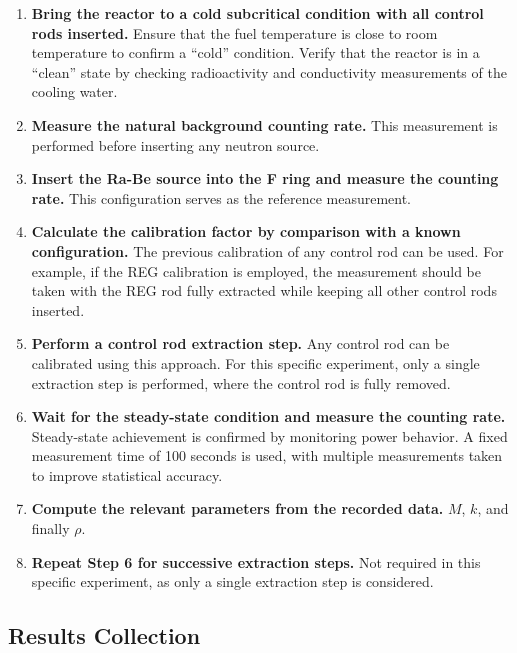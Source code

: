 \begin{enumerate}
    \item \textbf{Bring the reactor to a cold subcritical condition with all control rods inserted.}  
    Ensure that the fuel temperature is close to room temperature to confirm a ``cold'' condition.  
    Verify that the reactor is in a ``clean'' state by checking radioactivity and conductivity measurements of the cooling water.

    \item \textbf{Measure the natural background counting rate.}  
    This measurement is performed before inserting any neutron source.

    \item \textbf{Insert the Ra-Be source into the F ring and measure the counting rate.}  
    This configuration serves as the reference measurement.

    \item \textbf{Calculate the calibration factor by comparison with a known configuration.}  
    The previous calibration of any control rod can be used. For example, if the REG calibration is employed, the measurement should be taken with the REG rod fully extracted while keeping all other control rods inserted.

    \item \textbf{Perform a control rod extraction step.}  
    Any control rod can be calibrated using this approach. For this specific experiment, only a single extraction step is performed, where the control rod is fully removed.

    \item \textbf{Wait for the steady-state condition and measure the counting rate.}  
    Steady-state achievement is confirmed by monitoring power behavior.  
    A fixed measurement time of 100 seconds is used, with multiple measurements taken to improve statistical accuracy.

    \item \textbf{Compute the relevant parameters from the recorded data.} $M$, $k$, and finally $\rho$.

    \item \textbf{Repeat Step 6 for successive extraction steps.}  
    Not required in this specific experiment, as only a single extraction step is considered.
\end{enumerate}


\subsection{Results Collection}


